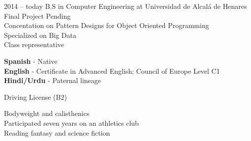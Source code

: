 \documentclass[9pt]{developercv} %
\begin{document}
\vspace{0.3cm}

\begin{entrylist}
	\entry
		{2014 -- today}
		{B.S in Computer Engineering at Universidad de Alcalá de Henares} 
		{}
		{\\Final Project Pending\\Concentation on Pattern Designs for Object Oriented Programming\\Specialized on Big Data\\Class representative}
\end{entrylist}


\begin{minipage}[t]{0.6\textwidth}
	\vspace{-\baselineskip} %
	
	\textbf{Spanish} - Native\\
	\textbf{English} - Certificate in Advanced English; Council of Europe Level C1\\
	\textbf{Hindi/Urdu} - Paternal lineage
\end{minipage}
\hfill
\begin{minipage}[t]{0.3\textwidth}
	\vspace{0mm}

	
	Driving License (B2)
\end{minipage}

\vspace{0.3cm}

\begin{minipage}[t]{1\textwidth}

	Bodyweight and calisthenics\\
	Participated seven years on an athletics club\\
	Reading fantasy and science fiction

\end{minipage}
\hfill


\end{document}
